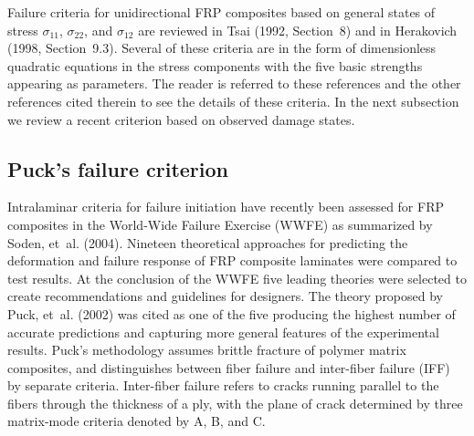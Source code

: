 \documentclass{AeroStructure-ERJohnson}
\begin{document}
Failure criteria for unidirectional FRP composites based on general states of stress $\sigma_{11}$, $\sigma_{22}$, and $\sigma_{12}$ are reviewed in Tsai (1992, Section~8) and in Herakovich (1998, Section~9.3). Several of these criteria are in the form of dimensionless quadratic equations in the stress components with the five basic strengths appearing as parameters. The reader is referred to these references and the other references cited therein to see the details of these criteria. In the next subsection we review a recent criterion based on observed damage states.

\subsection{Puck's failure criterion}\label{sec9.1.1}

Intralaminar criteria for failure initiation have recently been assessed for FRP composites in the World-Wide Failure Exercise (WWFE) as summarized by Soden, et~al. (2004). Nineteen theoretical approaches for predicting the deformation and failure response of FRP composite laminates were compared to test results. At the conclusion of the WWFE five leading theories were selected to create recommendations and guidelines for designers. The theory proposed by Puck, et~al. (2002) was cited as one of the five producing the highest number of accurate predictions and capturing more general features of the experimental results. Puck's methodology assumes brittle fracture of polymer matrix composites, and distinguishes between fiber failure and inter-fiber failure (IFF) by separate criteria. Inter-fiber failure refers to cracks running parallel to the fibers through the thickness of a ply, with the plane of crack determined by three matrix-mode criteria denoted by A, B, and C.
\end{document}
